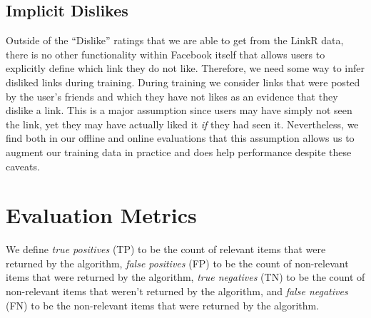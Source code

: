 \subsection{Implicit Dislikes}

Outside of the ``Dislike'' ratings that we are able to get from the
LinkR data, there is no other functionality within Facebook itself
that allows users to explicitly define which link they do not
like. Therefore, we need some way to infer disliked links during
training. During training we consider links that were posted by the
user's friends and which they have not likes as an evidence that they
dislike a link. This is a major assumption since users may have simply
not seen the link, yet they may have actually liked it \emph{if} they
had seen it.  Nevertheless, we find both in our offline and online
evaluations that this assumption allows us to augment our training
data in practice and does help performance despite these caveats.

\section{Evaluation Metrics}

We define \emph{true positives} (TP) to be the count of relevant items
that were returned by the algorithm, \emph{false positives} (FP) to be the
count of non-relevant items that were returned by the algorithm, \emph{true
negatives} (TN) to be the count of non-relevant items that weren't
returned by the algorithm, and \emph{false negatives} (FN) to be the
non-relevant items that were returned by the algorithm.

